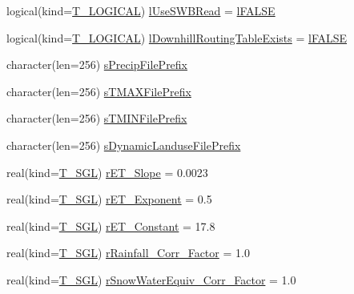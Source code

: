 \begin{DoxyCompactItemize}
\item 
logical(kind=\hyperlink{namespacetest_acdeac586276a7d1d394fb5eddc77fc3d}{T\_\-LOGICAL}) \hyperlink{typetest_1_1_t___m_o_d_e_l___c_o_n_f_i_g_u_r_a_t_i_o_n_a6ebd10ca270bb3e7f099aaae209bf652}{lUseSWBRead} = \hyperlink{namespacetest_ad44869e0204417021792170cd610ee25}{lFALSE}
\item 
logical(kind=\hyperlink{namespacetest_acdeac586276a7d1d394fb5eddc77fc3d}{T\_\-LOGICAL}) \hyperlink{typetest_1_1_t___m_o_d_e_l___c_o_n_f_i_g_u_r_a_t_i_o_n_ae5d1fe2554515bae02751a3c4cfdc691}{lDownhillRoutingTableExists} = \hyperlink{namespacetest_ad44869e0204417021792170cd610ee25}{lFALSE}
\item 
character(len=256) \hyperlink{typetest_1_1_t___m_o_d_e_l___c_o_n_f_i_g_u_r_a_t_i_o_n_a97a1395975346ce74d264c692e2c89b6}{sPrecipFilePrefix}
\item 
character(len=256) \hyperlink{typetest_1_1_t___m_o_d_e_l___c_o_n_f_i_g_u_r_a_t_i_o_n_aeadda621ddb359ae4054df5d516d5a22}{sTMAXFilePrefix}
\item 
character(len=256) \hyperlink{typetest_1_1_t___m_o_d_e_l___c_o_n_f_i_g_u_r_a_t_i_o_n_ac04fd45ee598d3753889af0f33392f9f}{sTMINFilePrefix}
\item 
character(len=256) \hyperlink{typetest_1_1_t___m_o_d_e_l___c_o_n_f_i_g_u_r_a_t_i_o_n_a7ebda5dc3d2753db4a3fd0b98698b844}{sDynamicLanduseFilePrefix}
\item 
real(kind=\hyperlink{namespacetest_a04d8b9090502de3a00046fe904bc3d99}{T\_\-SGL}) \hyperlink{typetest_1_1_t___m_o_d_e_l___c_o_n_f_i_g_u_r_a_t_i_o_n_a40f661191ec8ef684a86c4f5c4eb1982}{rET\_\-Slope} = 0.0023
\item 
real(kind=\hyperlink{namespacetest_a04d8b9090502de3a00046fe904bc3d99}{T\_\-SGL}) \hyperlink{typetest_1_1_t___m_o_d_e_l___c_o_n_f_i_g_u_r_a_t_i_o_n_af8bee30424a7860afebf85ea40ef1462}{rET\_\-Exponent} = 0.5
\item 
real(kind=\hyperlink{namespacetest_a04d8b9090502de3a00046fe904bc3d99}{T\_\-SGL}) \hyperlink{typetest_1_1_t___m_o_d_e_l___c_o_n_f_i_g_u_r_a_t_i_o_n_aca4de8d6735f39e9a7f04c423d71db3a}{rET\_\-Constant} = 17.8
\item 
real(kind=\hyperlink{namespacetest_a04d8b9090502de3a00046fe904bc3d99}{T\_\-SGL}) \hyperlink{typetest_1_1_t___m_o_d_e_l___c_o_n_f_i_g_u_r_a_t_i_o_n_a2ec91c83b69bb8fe206ae9d047ec496c}{rRainfall\_\-Corr\_\-Factor} = 1.0
\item 
real(kind=\hyperlink{namespacetest_a04d8b9090502de3a00046fe904bc3d99}{T\_\-SGL}) \hyperlink{typetest_1_1_t___m_o_d_e_l___c_o_n_f_i_g_u_r_a_t_i_o_n_af70aeb6ad8adf4758b3adf82e51787a8}{rSnowWaterEquiv\_\-Corr\_\-Factor} = 1.0

\end{DoxyCompactItemize}
